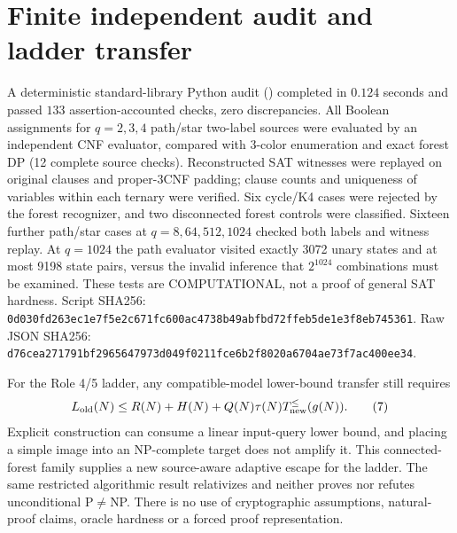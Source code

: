 \documentclass[11pt]{article}
\begin{document}
\section{Finite independent audit and ladder transfer}
A deterministic standard-library Python audit
()
completed in $0.124$ seconds and passed $133$
assertion-accounted checks, zero discrepancies.
All Boolean assignments for $q=2,3,4$ path/star
two-label sources were evaluated by an independent
CNF evaluator, compared with 3-color enumeration
and exact forest DP (12 complete source checks).
Reconstructed SAT witnesses were replayed on
original clauses and proper-3CNF padding; clause
counts and uniqueness of variables within each
ternary were verified. Six cycle/K4 cases
were rejected by the forest recognizer, and two
disconnected forest controls were classified.
Sixteen further path/star cases at
$q=8,64,512,1024$ checked both labels and
witness replay. At $q=1024$ the path evaluator
visited exactly 3072 unary states and at most
9198 state pairs, versus the invalid inference
that $2^{1024}$ combinations must be examined.
These tests are COMPUTATIONAL, not a proof of
general SAT hardness.
Script SHA256:
\texttt{0d030fd263ec1e7f5e2c671fc600ac4738b49abfbd72ffeb5de1e3f8eb745361}.
Raw JSON SHA256:
\texttt{d76cea271791bf2965647973d049f0211fce6b2f8020a6704ae73f7ac400ee34}.

For the Role 4/5 ladder, any compatible-model
lower-bound transfer still requires
\[
L_{\rm old}(N)
\le R(N)+H(N)+Q(N)\tau(N)T_{\rm new}^{\le}(g(N)).
\tag{7}
\]
Explicit construction can consume a linear
input-query lower bound, and placing a simple
image into an NP-complete target does not
amplify it. This connected-forest family
supplies a new source-aware adaptive escape
for the ladder. The same restricted
algorithmic result relativizes and neither
proves nor refutes unconditional P$\ne$NP.
There is no use of cryptographic assumptions,
natural-proof claims, oracle hardness or a
forced proof representation.
\end{document}
